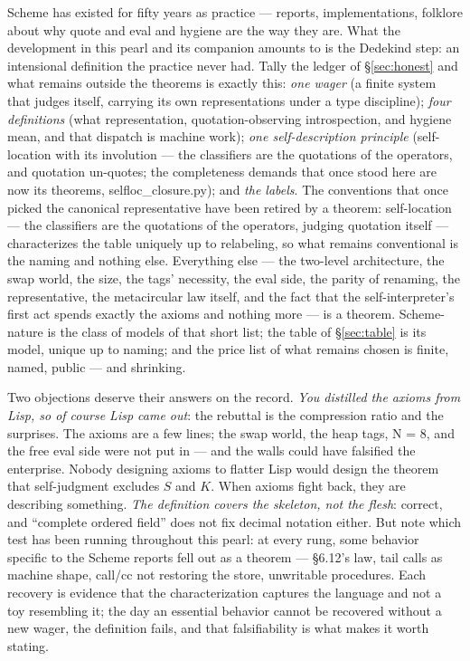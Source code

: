 \documentclass[acmsmall,screen,review]{acmart}
\begin{document}
Scheme has existed for fifty years as practice --- reports,
implementations, folklore about why quote and eval and hygiene are
the way they are. What the development in this pearl and its
companion amounts to is the Dedekind step: an intensional definition
the practice never had. Tally the ledger of \S\ref{sec:honest} and
what remains outside the theorems is exactly this: \emph{one wager}
(a finite system that judges itself, carrying its own
representations under a type discipline); \emph{four definitions}
(what representation, quotation-observing introspection, and hygiene
mean, and that dispatch is machine work); \emph{one self-description
principle} (self-location with its involution --- the classifiers
are the quotations of the operators, and quotation un-quotes; the
completeness demands that once stood here are now its theorems,
\textsf{selfloc\_closure.py}); and \emph{the labels}. The
conventions that once picked
the canonical representative have been retired by a theorem:
self-location --- the classifiers are the quotations of the
operators, judging quotation itself --- characterizes the table
uniquely up to relabeling, so what remains conventional is the
naming and nothing else. Everything else --- the two-level
architecture, the swap world, the size, the tags' necessity, the
eval side, the parity of renaming, the representative, the
metacircular law itself, and the fact that the self-interpreter's
first act spends exactly the axioms and nothing more --- is a
theorem. Scheme-nature is the class of models of that short list;
the table of \S\ref{sec:table} is its model, unique up to naming;
and the price list of what remains chosen is finite, named, public
--- and shrinking.

Two objections deserve their answers on the record. \emph{You
distilled the axioms from Lisp, so of course Lisp came out}: the
rebuttal is the compression ratio and the surprises. The axioms are
a few lines; the swap world, the heap tags, N = 8, and the free eval
side were not put in --- and the walls could have falsified the
enterprise. Nobody designing axioms to flatter Lisp would design the
theorem that self-judgment excludes $S$ and $K$. When axioms fight
back, they are describing something. \emph{The definition covers the
skeleton, not the flesh}: correct, and ``complete ordered field''
does not fix decimal notation either. But note which test has been
running throughout this pearl: at every rung, some behavior specific
to the Scheme reports fell out as a theorem --- \S6.12's law, tail
calls as machine shape, \textsf{call/cc} not restoring the store,
unwritable procedures. Each recovery is evidence that the
characterization captures the language and not a toy resembling it;
the day an essential behavior cannot be recovered without a new
wager, the definition fails, and that falsifiability is what makes
it worth stating.
\end{document}
